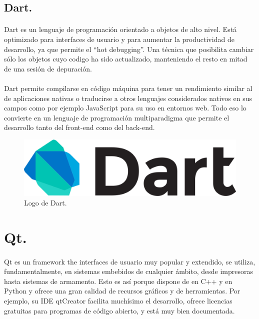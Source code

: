 \subsection{Dart.}\label{sec:dart}

\paragraph{}Dart es un lenguaje de programación orientado a objetos de alto nivel.
Está optimizado para interfaces de usuario y para aumentar la productividad de desarrollo,
ya que permite el ``hot debugging''. Una técnica que posibilita cambiar sólo los objetos cuyo
codigo ha sido actualizado, manteniendo el resto en mitad de una sesión de depuración.
\cite{dart}

\paragraph{}Dart permite compilarse en código máquina para tener un rendimiento similar al
de aplicaciones nativas o traducirse a otros lenguajes considerados nativos en sus campos
como por ejemplo JavaScript para su uso en entornos web. Todo eso lo convierte en un
lenguaje de programación multiparadigma que permite el desarrollo tanto del \gls{front-end}
como del \gls{back-end}.

\begin{figure}[H]
	\centering
	\includegraphics[width=0.50\linewidth]{imgs/dart-logo}
	\caption[Dart Logo]{Logo de Dart.}
	\label{fig:dart}
\end{figure}

\section{Qt.}\label{sec:Qt}

\paragraph{}Qt es un \gls{framework} the interfaces de usuario muy popular y extendido,
se utiliza, fundamentalmente, en sistemas embebidos de cualquier ámbito, desde impresoras
hasta sistemas de armamento. Esto es así porque dispone de  en C++ y en
Python y ofrece una gran calidad de recursos gráficos y de herramientas. Por ejemplo,
su \gls{IDE} qtCreator facilita muchísimo el desarrollo, ofrece licencias gratuitas para
programas de código abierto, y está muy bien documentada.

